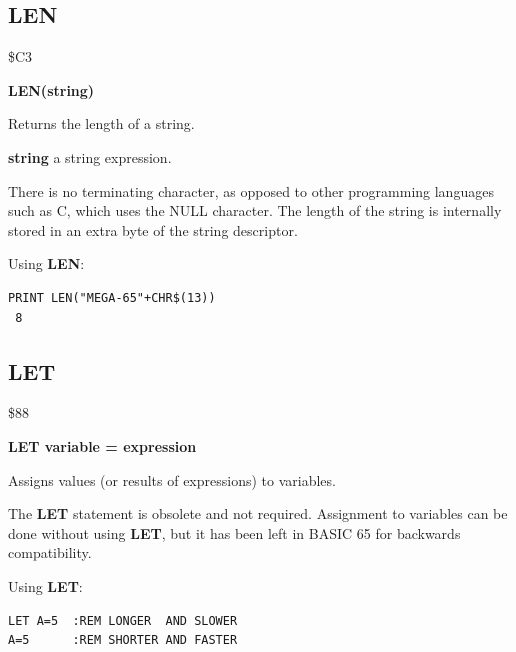 \subsection{LEN}
\begin{description}[leftmargin=2cm,style=nextline]
\item [Token:] \$C3
\item [Format:] {\bf LEN(string)}
\item [Usage:] Returns the length of a string.

               {\bf string} a string expression.

\item [Remarks:] There is no terminating character, as opposed to
                 other programming languages such as C, which uses
                 the NULL character. The length of
                 the string is internally stored in an extra byte of
                 the string descriptor.

\item [Example:] Using {\bf LEN}:
\begin{tcolorbox}[colback=black,coltext=white]
\verbatimfont{\codefont}
\begin{verbatim}
PRINT LEN("MEGA-65"+CHR$(13))
 8
\end{verbatim}
\end{tcolorbox}
\end{description}


\newpage
\subsection{LET}
\begin{description}[leftmargin=2cm,style=nextline]
\item [Token:] \$88
\item [Format:] {\bf LET variable = expression}
\item [Usage:] Assigns values (or results of expressions) to variables.
\item [Remarks:] The {\bf LET} statement is obsolete and not required.
               Assignment to variables can be done without using
               {\bf LET}, but it has been left in BASIC 65 for backwards compatibility.

\item [Examples:] Using {\bf LET}:
\begin{tcolorbox}[colback=black,coltext=white]
\verbatimfont{\codefont}
\begin{verbatim}
LET A=5  :REM LONGER  AND SLOWER
A=5      :REM SHORTER AND FASTER
\end{verbatim}
\end{tcolorbox}
\end{description}

